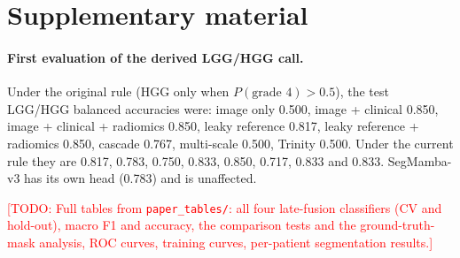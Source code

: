 \documentclass[11pt]{article}
\newcommand{\todo}[1]{\textcolor{red}{[TODO: #1]}}
\begin{document}



\appendix
\section{Supplementary material}

\paragraph{First evaluation of the derived LGG/HGG call.} Under the original rule (HGG only when
$P(\text{grade 4}) > 0.5$), the test LGG/HGG balanced accuracies were: image only 0.500, image + clinical 0.850,
image + clinical + radiomics 0.850, leaky reference 0.817, leaky reference + radiomics 0.850, cascade 0.767,
multi-scale 0.500, Trinity 0.500. Under the current rule they are 0.817, 0.783, 0.750, 0.833, 0.850, 0.717, 0.833 and
0.833. SegMamba-v3 has its own head (0.783) and is unaffected.

\todo{Full tables from \texttt{paper\_tables/}: all four late-fusion classifiers (CV and hold-out), macro F1 and
accuracy, the comparison tests and the ground-truth-mask analysis, ROC curves, training curves, per-patient
segmentation results.}
\end{document}
